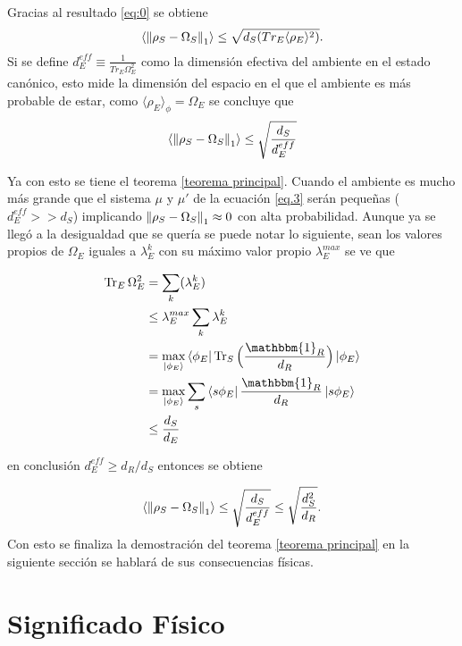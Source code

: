 Gracias al resultado \ref{eq:0} se obtiene
\begin{equation}
\langle \norm{\rho_{S} -\Omega_{S}}_{1} \rangle \le \sqrt{d_{S}(Tr_{E} \langle \rho_{E} \rangle^{2})}.
\end{equation}
Si se define $d_{E}^{eff} \equiv \frac{1}{Tr_{E} \Omega_{E}^{2}}$ como la dimensión efectiva del ambiente en el estado canónico, esto mide la dimensión del espacio en el que el ambiente es más probable de estar, como $\langle \rho_{E} \rangle_{\phi} = \Omega_{E}$ se concluye que 
\begin{equation}
\langle \norm{\rho_{S} -\Omega_{S}}_{1} \rangle \le \sqrt{\frac{d_{S}}{d_{E}^{eff}}}
\end{equation}

Ya con esto se tiene el teorema \ref{teorema principal}. Cuando  el ambiente es mucho más grande que el sistema $\mu$ y $\mu'$  de la ecuación \ref{eq.3} serán pequeñas ($d_{E}^{eff}>>d_{S}$) implicando $\norm{\rho_{S} -\Omega_{S}}_{1} \approx 0$ con alta probabilidad. Aunque ya se llegó a la desigualdad que se quería se puede notar lo siguiente, sean los valores propios de $\Omega_{E}$ iguales a $\lambda_{E}^{k}$ con su máximo valor propio $\lambda_{E}^{max}$ se ve que 

\begin{align*}
\Tr_{E} \Omega_{E}^{2} &= \sum_{k} (\lambda_{E}^{k})\\
&\leq \lambda_{E}^{max} \sum_{k} \lambda_{E}^{k}\\
&= \max_{\ket{\phi_{E}}} \bra{\phi_{E}} \Tr_{S} \Big( \frac{\mathbbm{1}_{R}}{d_{R}} \Big) \ket{\phi_{E}}\\
&= \max_{\ket{\phi_{E}}} \sum_{s} \bra{s \phi_{E}} \frac{\mathbbm{1}_{R}}{d_{R}} \ket{s \phi_{E}} \\
&\leq \frac{d_{S}}{d_{E}}	
\end{align*}

en conclusión  $d^{eff}_{E} \geq d_{R}/ d_{S}$ entonces se obtiene

\begin{equation}
\langle \norm{\rho_{S} - \Omega_{S}}_{1} \rangle \leq \sqrt{\frac{d_{S}}{d_{E}^{eff}}} \leq  \sqrt{\frac{d_{S}^{2}}{d_{R}}}.
\end{equation}
Con esto se finaliza la demostración del teorema \ref{teorema principal} en la siguiente sección se hablará de sus consecuencias físicas.

\section{Significado Físico}

